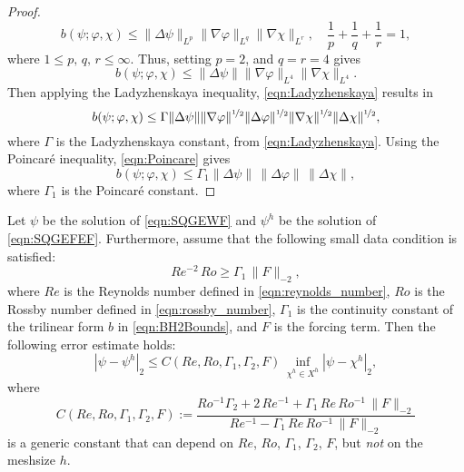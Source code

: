 \begin{proof}
\begin{equation}
    b(\psi;\varphi,\chi) \le \|\Delta \psi\|_{L^p} \|\nabla \varphi\|_{L^q}
      \|\nabla \chi\|_{L^r},\quad \frac{1}{p}+\frac{1}{q}+\frac{1}{r}=1,
    \label{eqn:HolderB}
  \end{equation}
  where $1\le p,\,q,\,r\le \infty$. Thus, setting $p = 2$, and $q = r = 4$ gives
  \begin{equation*}
    b(\psi;\varphi,\chi) \le \|\Delta \psi\| \|\nabla \varphi\|_{L^4} \|\nabla
      \chi\|_{L^4}.
  \end{equation*}
  Then applying the Ladyzhenskaya inequality, \eqref{eqn:Ladyzhenskaya} results in
  \begin{equation*}
    b(\psi;\varphi,\chi) \le \Gamma \|\Delta \psi\|
      \|\nabla \varphi\|^{\nicefrac{1}{2}} \|\Delta \varphi\|^{\nicefrac{1}{2}}
      \|\nabla \chi\|^{\nicefrac{1}{2}} \|\Delta \chi\|^{\nicefrac{1}{2}},
  \end{equation*}
  where $\Gamma$ is the Ladyzhenskaya constant, from \eqref{eqn:Ladyzhenskaya}.
  Using the Poincar\'e inequality, \eqref{eqn:Poincare} gives
  \begin{equation*}
    b(\psi;\varphi,\chi) \le \Gamma_1 \|\Delta \psi\|\, \|\Delta \varphi\|\,
      \|\Delta \chi\|,
  \end{equation*}
  where $\Gamma_1$ is the Poincar\'e constant.
\end{proof}

\begin{thm}
\label{thm:EnergyNorm}
  Let $\psi$ be the solution of \eqref{eqn:SQGEWF} and $\psi^h$ be the solution
  of \eqref{eqn:SQGEFEF}.
  Furthermore, assume that the following small data condition is satisfied:
  \begin{equation}
    Re^{-2} \, Ro \geq \Gamma_1 \, \| F \|_{-2} ,
    \label{eqn:small_data_condition}
  \end{equation}
  where $Re$ is the Reynolds number defined in \eqref{eqn:reynolds_number}, $Ro$
  is the Rossby number defined in \eqref{eqn:rossby_number}, $\Gamma_1$ is the
  continuity constant of the trilinear form $b$ in \eqref{eqn:BH2Bounds}, and $F$
  is the forcing term. Then the following error estimate holds:
  \begin{equation}
    |\psi - \psi^h|_2 \le C(Re, Ro, \Gamma_1, \Gamma_2, F) \,
      \inf_{\chi^h \in X^h} |\psi - \chi^h|_2 ,
    \label{eqn:EnergyNorm}
  \end{equation}
  where
  \begin{equation}
    C(Re, Ro, \Gamma_1, \Gamma_2, F)
      := \frac{ Ro^{-1} \Gamma_2 + 2 \, Re^{-1} + \Gamma_1 \, Re \, Ro^{-1} \,
        \| F \|_{-2} }
        { Re^{-1} - \Gamma_1 \, Re \, Ro^{-1} \, \| F \|_{-2} }
    \label{eqn:constant_definition}
  \end{equation}
  is a generic constant that can depend on $Re$, $Ro$, $\Gamma_1$, $\Gamma_2$, $F$, but
  \emph{not} on the meshsize $h$.
\end{thm}

